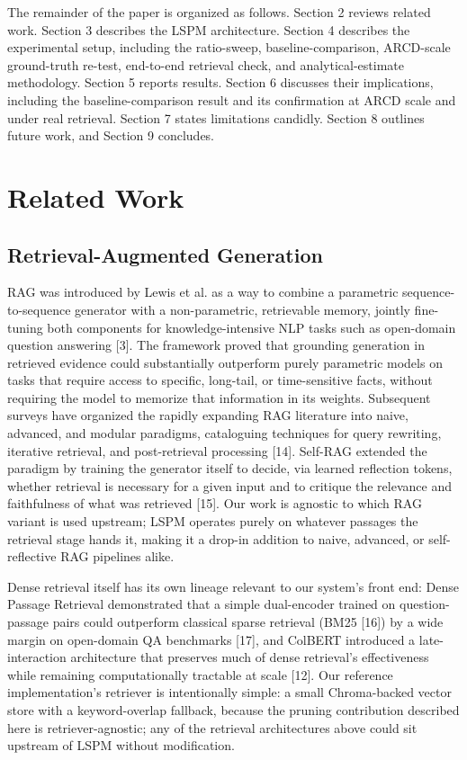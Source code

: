 The remainder of the paper is organized as follows. Section 2 reviews related work. Section 3 describes the LSPM architecture. Section 4 describes the experimental setup, including the ratio-sweep, baseline-comparison, ARCD-scale ground-truth re-test, end-to-end retrieval check, and analytical-estimate methodology. Section 5 reports results. Section 6 discusses their implications, including the baseline-comparison result and its confirmation at ARCD scale and under real retrieval. Section 7 states limitations candidly. Section 8 outlines future work, and Section 9 concludes.

\section{Related Work}
\subsection{Retrieval-Augmented Generation}
RAG was introduced by Lewis et al. as a way to combine a parametric sequence-to-sequence generator with a non-parametric, retrievable memory, jointly fine-tuning both components for knowledge-intensive NLP tasks such as open-domain question answering [3]. The framework proved that grounding generation in retrieved evidence could substantially outperform purely parametric models on tasks that require access to specific, long-tail, or time-sensitive facts, without requiring the model to memorize that information in its weights. Subsequent surveys have organized the rapidly expanding RAG literature into naive, advanced, and modular paradigms, cataloguing techniques for query rewriting, iterative retrieval, and post-retrieval processing [14]. Self-RAG extended the paradigm by training the generator itself to decide, via learned reflection tokens, whether retrieval is necessary for a given input and to critique the relevance and faithfulness of what was retrieved [15]. Our work is agnostic to which RAG variant is used upstream; LSPM operates purely on whatever passages the retrieval stage hands it, making it a drop-in addition to naive, advanced, or self-reflective RAG pipelines alike.

Dense retrieval itself has its own lineage relevant to our system's front end: Dense Passage Retrieval demonstrated that a simple dual-encoder trained on question-passage pairs could outperform classical sparse retrieval (BM25 [16]) by a wide margin on open-domain QA benchmarks [17], and ColBERT introduced a late-interaction architecture that preserves much of dense retrieval's effectiveness while remaining computationally tractable at scale [12]. Our reference implementation's retriever is intentionally simple: a small Chroma-backed vector store with a keyword-overlap fallback, because the pruning contribution described here is retriever-agnostic; any of the retrieval architectures above could sit upstream of LSPM without modification.

